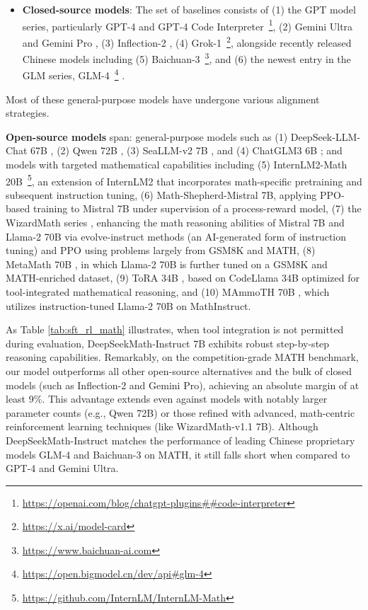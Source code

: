 \begin{itemize}[topsep=0pt]
    \item \textbf{Closed-source models}: The set of baselines consists of (1) the GPT model series, particularly GPT-4 \citep{gpt4} and GPT-4 Code Interpreter~\footnote{\url{https://openai.com/blog/chatgpt-plugins\#\#code-interpreter}}, (2) Gemini Ultra and Gemini Pro \citep{gemini}, (3) Inflection-2 \citep{inflection-2}, (4) Grok-1~\footnote{\url{https://x.ai/model-card}}, alongside recently released Chinese models including (5) Baichuan-3~\footnote{\url{https://www.baichuan-ai.com}}, and (6) the newest entry in the GLM series, GLM-4~\footnote{\url{https://open.bigmodel.cn/dev/api\#glm-4}} \citep{glm}.
\end{itemize}

Most of these general-purpose models have undergone various alignment strategies.

\item \textbf{Open-source models} span: general-purpose models such as (1) DeepSeek-LLM-Chat 67B \citep{deepseek-llm}, (2) Qwen 72B \citep{qwen}, (3) SeaLLM-v2 7B \citep{seallm}, and (4) ChatGLM3 6B \citep{chatglm3}; and models with targeted mathematical capabilities including (5) InternLM2-Math 20B~\footnote{\url{https://github.com/InternLM/InternLM-Math}}, an extension of InternLM2 that incorporates math-specific pretraining and subsequent instruction tuning, (6) Math-Shepherd-Mistral 7B, applying PPO-based training \citep{schulman2017proximal} to Mistral 7B \citep{mistral} under supervision of a process-reward model, (7) the WizardMath series \citep{wizardmath}, enhancing the math reasoning abilities of Mistral 7B and Llama-2 70B \citep{llama2} via evolve-instruct methods (an AI-generated form of instruction tuning) and PPO using problems largely from GSM8K and MATH, (8) MetaMath 70B \citep{metamath}, in which Llama-2 70B is further tuned on a GSM8K and MATH-enriched dataset, (9) ToRA 34B \cite{tora}, based on CodeLlama 34B optimized for tool-integrated mathematical reasoning, and (10) MAmmoTH 70B \citep{MathInstruct}, which utilizes instruction-tuned Llama-2 70B on MathInstruct.

As Table \ref{tab:sft_rl_math} illustrates, when tool integration is not permitted during evaluation, DeepSeekMath-Instruct 7B exhibits robust step-by-step reasoning capabilities. Remarkably, on the competition-grade MATH benchmark, our model outperforms all other open-source alternatives and the bulk of closed models (such as Inflection-2 and Gemini Pro), achieving an absolute margin of at least 9\%. This advantage extends even against models with notably larger parameter counts (e.g., Qwen 72B) or those refined with advanced, math-centric reinforcement learning techniques (like WizardMath-v1.1 7B). Although DeepSeekMath-Instruct matches the performance of leading Chinese proprietary models GLM-4 and Baichuan-3 on MATH, it still falls short when compared to GPT-4 and Gemini Ultra.

